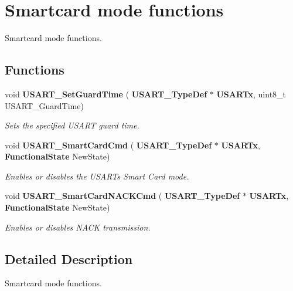 \section{Smartcard mode functions}
\label{group__USART__Group6}


Smartcard mode functions.  


\subsection*{Functions}
\begin{DoxyCompactItemize}
\item 
void \textbf{ U\+S\+A\+R\+T\+\_\+\+Set\+Guard\+Time} (\textbf{ U\+S\+A\+R\+T\+\_\+\+Type\+Def} $\ast$\textbf{ U\+S\+A\+R\+Tx}, uint8\+\_\+t U\+S\+A\+R\+T\+\_\+\+Guard\+Time)
\begin{DoxyCompactList}\small\item\em Sets the specified U\+S\+A\+RT guard time. \end{DoxyCompactList}\item 
void \textbf{ U\+S\+A\+R\+T\+\_\+\+Smart\+Card\+Cmd} (\textbf{ U\+S\+A\+R\+T\+\_\+\+Type\+Def} $\ast$\textbf{ U\+S\+A\+R\+Tx}, \textbf{ Functional\+State} New\+State)
\begin{DoxyCompactList}\small\item\em Enables or disables the U\+S\+A\+RT\textquotesingle{}s Smart Card mode. \end{DoxyCompactList}\item 
void \textbf{ U\+S\+A\+R\+T\+\_\+\+Smart\+Card\+N\+A\+C\+K\+Cmd} (\textbf{ U\+S\+A\+R\+T\+\_\+\+Type\+Def} $\ast$\textbf{ U\+S\+A\+R\+Tx}, \textbf{ Functional\+State} New\+State)
\begin{DoxyCompactList}\small\item\em Enables or disables N\+A\+CK transmission. \end{DoxyCompactList}\end{DoxyCompactItemize}


\subsection{Detailed Description}
Smartcard mode functions. 

